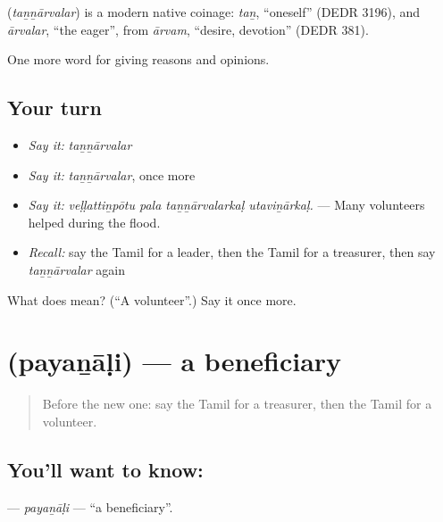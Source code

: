 \begin{cousinweb}
\textbf{} (\emph{taṉṉārvalar}) is a modern native coinage: \emph{taṉ}, \textquotedblleft{}oneself\textquotedblright{} (DEDR 3196), and \emph{ārvalar}, \textquotedblleft{}the eager\textquotedblright{}, from \emph{ārvam}, \textquotedblleft{}desire, devotion\textquotedblright{} (DEDR 381).
\end{cousinweb}

\begin{grammarlens}[title={What you've built}]
One more word for giving reasons and opinions.
\end{grammarlens}

\subsection*{Your turn}
\begin{itemize}
\raggedright
  \item \emph{Say it:} \emph{taṉṉārvalar}
  \item \emph{Say it:} \emph{taṉṉārvalar}, once more
  \item \emph{Say it:} \emph{veḷḷattiṉpōtu pala taṉṉārvalarkaḷ utaviṉārkaḷ.} — Many volunteers helped during the flood.
  \item \emph{Recall:} say the Tamil for a leader, then the Tamil for a treasurer, then say \emph{taṉṉārvalar} again
\end{itemize}

\begin{tcolorbox}[breakable,colback=teal!4,colframe=teal!35!black,title={Before you move on}]
What does  mean? (\textquotedblleft{}A volunteer\textquotedblright{}.) Say it once more.
\end{tcolorbox}
\section[\texorpdfstring{\ta{பயனாளி} (payaṉāḷi)}{பயனாளி (payaṉāḷi)}]{ (payaṉāḷi) — a beneficiary}

\label{lesson:TA-C379-payanali}



\begin{quote}
Before the new one: say the Tamil for a treasurer, then the Tamil for a volunteer.
\end{quote}

\subsection*{You'll want to know: }
\textbf{} — \emph{payaṉāḷi} — \textquotedblleft{}a beneficiary\textquotedblright{}.


